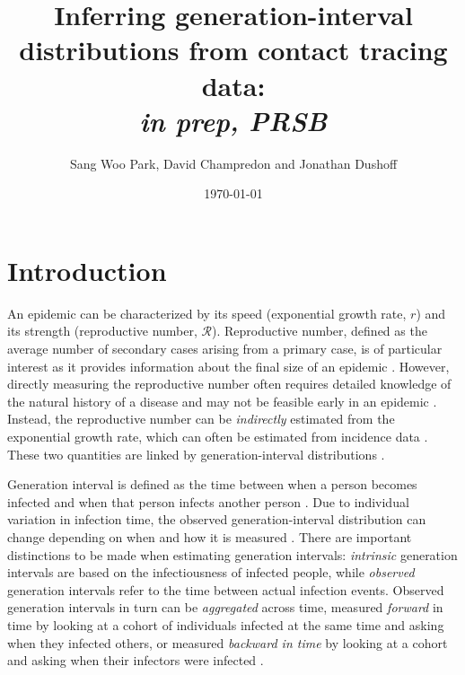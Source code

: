 \documentclass[12pt]{article}
\title{Inferring generation-interval distributions from contact tracing data: \\ \emph{in prep, PRSB}}
\author{Sang Woo Park, David Champredon and Jonathan Dushoff}
\date{\today}
\newcommand{\RR}{\ensuremath{{\mathcal R}}}
\begin{document}
\maketitle

\section{Introduction}


An epidemic can be characterized by its speed (exponential growth rate, $r$) and its strength (reproductive number, \RR).
Reproductive number, defined as the average number of secondary cases arising from a primary case, is of particular interest as it provides information about the final size of an epidemic \citep{anderson1991infectious, diekmann1990definition}.
However, directly measuring the reproductive number often requires detailed knowledge of the natural history of a disease and may not be feasible early in an epidemic \citep{dietz1993estimation}.
Instead, the reproductive number can be \emph{indirectly} estimated from the exponential growth rate, which can often be estimated from incidence data \citep{chowell2003sars, mills2004transmissibility, nishiura2009transmission, nishiura2010pros, ma2014estimating}.
These two quantities are linked by generation-interval distributions \citep{wearing2005appropriate, wallinga2007generation, roberts2007model,  park2019practical}.

Generation interval is defined as the time between when a person becomes infected and when that person infects another person \citep{svensson2007note}.
Due to individual variation in infection time, the observed generation-interval distribution can change depending on when and how it is measured \citep{svensson2007note, kenah2008generation, nishiura2010time, champredon2015intrinsic}.
There are important distinctions to be made when estimating generation intervals: \emph{intrinsic} generation intervals are based on the infectiousness of infected people,
while \emph{observed} generation intervals refer to the time between actual infection events.
Observed generation intervals in turn can be \emph{aggregated} across time, measured \emph{forward} in time by looking at a cohort of individuals infected at the same time and asking when they infected others, or measured \emph{backward in time} by looking at a cohort and asking when their infectors were infected \citep{champredon2015intrinsic}.
\end{document}

